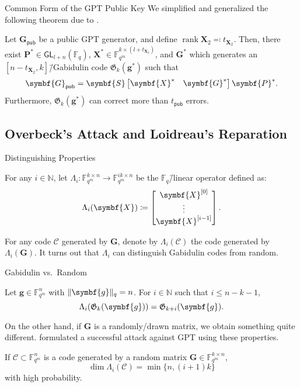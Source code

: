 \documentclass[usepdftitle=false]{beamer}
\renewcommand*{\vec}{\symbf}
\newcommand*{\mat}{\symbf}
\DeclareMathOperator{\rank}{rank}
\newcommand*{\GL}{\ensuremath{\mathsf{GL}}}
\newcommand*{\pub}{\ensuremath{\mathsf{pub}}}
\newcommand*{\FF}{\ensuremath{\mathbb{F}}}
\newcommand*{\NN}{\ensuremath{\mathbb{N}}}
\newcommand*{\Gab}{\ensuremath{\mathfrak{G}}}
\DeclarePairedDelimiter{\norm}{\lVert}{\rVert}
\newcommand*{\normR}[2]{\ensuremath{\norm{#1}_{#2}}}
\begin{document}
\begin{frame}{Common Form of the GPT Public Key}
  We simplified and generalized the following theorem due to
  \citeauthor{Ksh07}.
  \begin{theorem}
    Let \(\mat{G}_{\pub}\) be a public GPT generator, and define
    \(\rank\mat{X}_2 \eqqcolon t_{\mat{X}_2}\).  Then, there exist
    \(\mat{P}^* \in \GL_{l + n}(\FF_q)\),
    \(\mat{X}^* \in \FF_{q^m}^{k \times (l + t_{\mat{X}_2})}\), and
    \(\mat{G}^*\) which generates an
    \([n - t_{\mat{X}_2}, k]\)\=/Gabidulin code \(\Gab_k(\vec{g}^*)\)
    such that
    \[
      \mat{G}_{\pub} =
      \mat{S}
      \begin{bmatrix} \mat{X}^* & \mat{G}^* \end{bmatrix}
      \mat{P}^*\text.
    \]
    Furthermore, \(\Gab_k(\vec{g}^*)\) can correct more than
    \(t_{\pub}\) errors.
  \end{theorem}
\end{frame}

\subsection{Overbeck's Attack and Loidreau's Reparation}

\begin{frame}{Distinguishing Properties}
  \begin{definition}
    For any \(i \in \NN\), let
    \(\Lambda_i\colon \FF_{q^m}^{k \times n} \to \FF_{q^m}^{i k \times
      n}\) be the \(\FF_q\)\=/linear operator defined as:
    \[
      \Lambda_i(\mat{X}) \coloneqq
      \begin{bmatrix}
        \mat{X}^{[0]} \\
        \vdots \\ \mat{X}^{[i - 1]}
      \end{bmatrix}\text.
    \]
  \end{definition}
  For any code \(\mathcal{C}\) generated by \(\mat{G}\), denote by
  \(\Lambda_i(\mathcal{C})\) the code generated by
  \(\Lambda_i(\mat{G})\).  \alert{It turns out that \(\Lambda_i\) can
    distinguish Gabidulin codes from random}.
\end{frame}

\begin{frame}{Gabidulin vs.\ Random}
  \begin{lemma}
    Let \(\vec{g} \in \FF_{q^m}^n\) with \(\normR{\vec{g}}{q} = n\).
    For \(i \in \NN\) such that \(i \le n - k - 1\),
    \[
      \Lambda_i(\Gab_k(\vec{g})) = \Gab_{k + i}(\vec{g})\text.
    \]
  \end{lemma}
  On the other hand, if \(\mat{G}\) is a randomly\-/drawn matrix, we
  obtain something quite different.   formulated a
  successful attack against GPT using these properties.
  \begin{lemma}
    If \(\mathcal{C} \subset \FF_{q^m}^n\) is a code generated by a
    random matrix \(\mat{G} \in \FF_{q^m}^{k \times n}\),
    \[
      \dim\Lambda_i(\mathcal{C}) = \min\{n, (i + 1) k\}
    \]
    with high probability.
  \end{lemma}
\end{frame}
\end{document}
